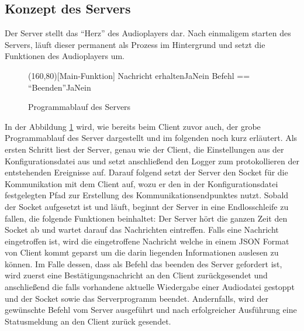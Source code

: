 \subsection{Konzept des Servers}

Der Server stellt das \enquote{Herz} des Audioplayers dar. Nach einmaligem
starten des Servers, läuft dieser permanent als Prozess im Hintergrund und
setzt die Funktionen des Audioplayers um.

\begin{figure}[H]
    \begin{struktogramm}(160,80)[Main-Funktion] 
        	 {Nachricht erhalten}{Ja}{Nein}
        	     {Befehl == \enquote{Beenden}}{Ja}{Nein}
        	    	\change
        	    \ifend
        		\change
        	\ifend
        \whileend
    \end{struktogramm} 
\caption{Programmablauf des Servers} 
\label{lst:server_ablauf} 
\end{figure}

In der Abbildung \ref{lst:server_ablauf} wird, wie bereits beim Client zuvor
auch, der grobe Programmablauf des Server dargestellt und im folgenden noch
kurz erläutert. Als ersten Schritt liest der Server, genau wie der Client, die
Einstellungen aus der Konfigurationsdatei aus und setzt anschließend den Logger
zum protokollieren der entstehenden Ereignisse auf. Darauf folgend setzt der
Server den Socket für die Kommunikation mit dem Client auf, wozu er den in der
Konfigurationsdatei festgelegten Pfad zur Erstellung des
Kommunikationsendpunktes nutzt. Sobald der Socket aufgesetzt ist und läuft,
beginnt der Server in eine Endlosschleife zu fallen, die folgende Funktionen
beinhaltet: Der Server hört die ganzen Zeit den Socket ab und wartet darauf das
Nachrichten eintreffen. Falls eine Nachricht eingetroffen ist, wird die
eingetroffene Nachricht welche in einem \ac{JSON} Format von Client kommt
geparst um die darin liegenden Informationen auslesen zu können. Im Falle
dessen, dass als Befehl das beenden des Server gefordert ist, wird zuerst eine
Bestätigungsnachricht an den Client zurückgesendet und anschließend die falls
vorhandene aktuelle Wiedergabe einer Audiodatei gestoppt und der Socket sowie
das Serverprogramm beendet. Andernfalls, wird der gewünschte Befehl vom Server
ausgeführt und nach erfolgreicher Ausführung eine Statusmeldung an den Client
zurück gesendet.
	

